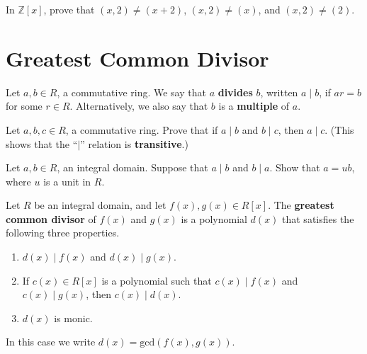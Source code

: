 \begin{problem}\label{prob:notprinid}
In \(\mathbb{Z}[x]\), prove that \((x,2) \neq (x+2)\), \((x,2) \neq (x)\), and \((x,2) \neq (2)\).
\begin{annotation}
\end{annotation}
\end{problem}

\section{Greatest Common Divisor}
\begin{definition}
Let \(a,b\in R\), a commutative ring. We say that \(a\) \textbf{divides} \(b\), written \(a\mid b\),  if \(ar = b\) for some \(r \in R\). Alternatively, we also say that \(b\) is a \textbf{multiple} of \(a\).
\end{definition}

\begin{problem}
Let \(a,b,c\in R\), a commutative ring. Prove that if \(a\mid b\) and \(b\mid c\), then \(a \mid c\). (This shows that the ``\(\mid\)'' relation is \textbf{transitive}.)
\end{problem}

\begin{problem}
Let \(a,b\in R\), an integral domain. Suppose that \(a \mid b\) and \(b \mid a\). Show that \(a = ub\), where \(u\) is a unit in \(R\).
\end{problem}

\begin{definition}
Let \(R\) be an integral domain, and let \(f(x),g(x)\in R[x]\). The \textbf{greatest common divisor} of \(f(x)\) and \(g(x)\) is a polynomial \(d(x)\) that satisfies the following three properties.
\begin{enumerate}
  \item \(d(x) \mid f(x)\) and \(d(x) \mid g(x)\).
  \item If \(c(x)\in R[x]\) is a polynomial such that \(c(x) \mid f(x)\) and \(c(x) \mid g(x)\), then \(c(x) \mid d(x)\).
  \item \(d(x)\) is monic.
\end{enumerate}
In this case we write \(d(x) = \mbox{gcd}(f(x),g(x))\).
\end{definition}

